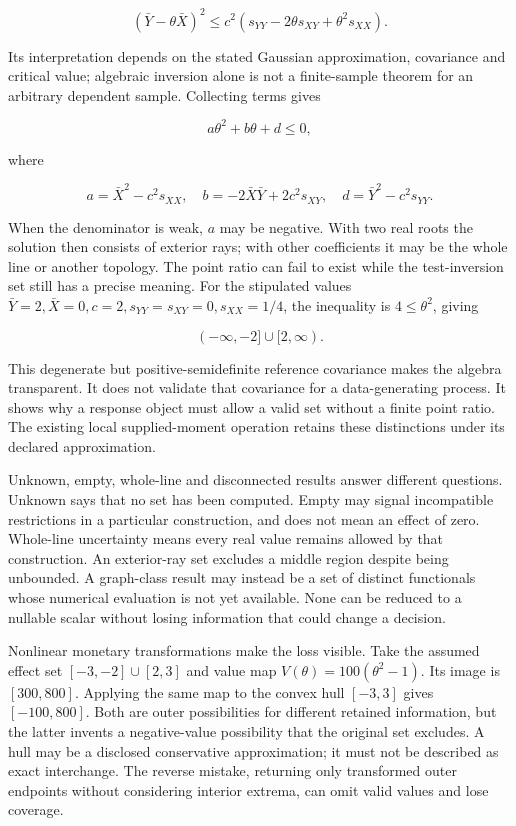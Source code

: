 \[
 (\bar Y-\theta\bar X)^2
 \leq c^2(s_{YY}-2\theta s_{XY}+\theta^2s_{XX}).
\]

Its interpretation depends on the stated Gaussian approximation,
covariance and critical value; algebraic inversion alone is not a
finite-sample theorem for an arbitrary dependent sample. Collecting
terms gives

\[
 a\theta^2+b\theta+d\leq0,
\]

where

\[
 a=\bar X^2-c^2s_{XX},\quad
 b=-2\bar X\bar Y+2c^2s_{XY},\quad
 d=\bar Y^2-c^2s_{YY}.
\]

When the denominator is weak, \(a\) may be negative. With two real roots
the solution then consists of exterior rays; with other coefficients it
may be the whole line or another topology. The point ratio can fail to
exist while the test-inversion set still has a precise meaning. For the
stipulated values \(\bar Y=2,\bar X=0,c=2,s_{YY}=s_{XY}=0,s_{XX}=1/4\),
the inequality is \(4\leq\theta^2\), giving

\[
 (-\infty,-2]\cup[2,\infty).
\]

This degenerate but positive-semidefinite reference covariance makes the
algebra transparent. It does not validate that covariance for a
data-generating process. It shows why a response object must allow a
valid set without a finite point ratio. The existing local
supplied-moment operation retains these distinctions under its declared
approximation.
\citep{exec13_interchange_examples,exec13_interchange_runtime}

Unknown, empty, whole-line and disconnected results answer different
questions. Unknown says that no set has been computed. Empty may signal
incompatible restrictions in a particular construction, and does not
mean an effect of zero. Whole-line uncertainty means every real value
remains allowed by that construction. An exterior-ray set excludes a
middle region despite being unbounded. A graph-class result may instead
be a set of distinct functionals whose numerical evaluation is not yet
available. None can be reduced to a nullable scalar without losing
information that could change a decision.

Nonlinear monetary transformations make the loss visible. Take the
assumed effect set \([-3,-2]\cup[2,3]\) and value map
\(V(\theta)=100(\theta^2-1)\). Its image is \([300,800]\). Applying the
same map to the convex hull \([-3,3]\) gives \([-100,800]\). Both are
outer possibilities for different retained information, but the latter
invents a negative-value possibility that the original set excludes. A
hull may be a disclosed conservative approximation; it must not be
described as exact interchange. The reverse mistake, returning only
transformed outer endpoints without considering interior extrema, can
omit valid values and lose coverage. \citep{exec13_interchange_examples}

